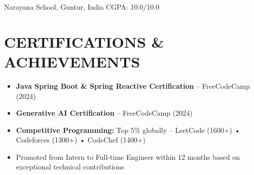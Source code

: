 \documentclass[10pt,a4paper]{article}
\begin{document}
Narayana School, Guntur, India \hfill CGPA: 10.0/10.0

\section*{CERTIFICATIONS \& ACHIEVEMENTS}

\begin{itemize}[leftmargin=1.3em, itemsep=0pt, parsep=0pt, topsep=1pt]
    \item \textbf{Java Spring Boot \& Spring Reactive Certification} -- FreeCodeCamp (2024)
    \item \textbf{Generative AI Certification} -- FreeCodeCamp (2024)
    \item \textbf{Competitive Programming:} Top 5\% globally -- LeetCode (1600+) • Codeforces (1300+) • CodeChef (1400+)
    \item Promoted from Intern to Full-time Engineer within 12 months based on exceptional technical contributions
\end{itemize}
\end{document}
